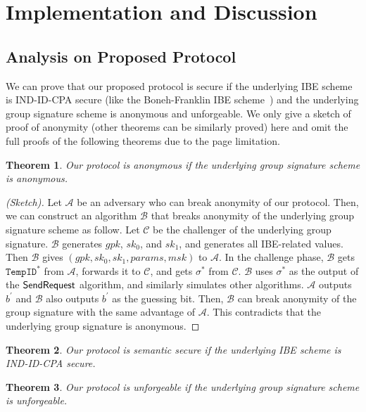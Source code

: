 \documentclass[preprint]{sig-alternate}
\newtheorem{theorem}{Theorem}[section]
\begin{document}
\section{Implementation and Discussion}

\subsection{Analysis on Proposed Protocol}

We can prove that our proposed protocol is secure if the underlying IBE scheme is IND-ID-CPA secure (like the Boneh-Franklin IBE scheme~\cite{[BonehF03]}) and the underlying group signature scheme is anonymous and unforgeable. 
We only give a sketch of proof of anonymity (other theorems can be similarly proved) here and omit the full proofs of the following theorems due to the page limitation. 

\begin{theorem}
Our protocol is anonymous if the underlying group signature scheme is anonymous. 
\end{theorem}

\begin{proof}[(Sketch)] Let $\mathcal{A}$ be an adversary who can break anonymity of our protocol. Then, we can construct an algorithm $\mathcal{B}$ that breaks anonymity of the underlying group signature scheme as follow. Let $\mathcal{C}$ be the challenger of the underlying group signature. 
$\mathcal{B}$ generates $gpk$, $sk_0$, and $sk_1$, and generates all IBE-related values. Then $\mathcal{B}$ gives $(gpk,sk_0,sk_1,\allowbreak params,\allowbreak msk)$ to $\mathcal{A}$. In the challenge phase, $\mathcal{B}$ gets $\mathtt{TempID}^\ast$ from $\mathcal{A}$, forwards it to $\mathcal{C}$, and gets $\sigma^\ast$ from $\mathcal{C}$. $\mathcal{B}$ uses $\sigma^\ast$ as the output of the ${\sf SendRequest}$ algorithm, and similarly simulates other algorithms. $\mathcal{A}$ outputs $b^\prime$ and $\mathcal{B}$ also outputs $b^\prime$ as the guessing bit. Then, $\mathcal{B}$ can break anonymity of the group signature with the same advantage of $\mathcal{A}$. This contradicts that the underlying group signature is anonymous.
\end{proof}

\begin{theorem}
Our protocol is semantic secure if the underlying IBE scheme is IND-ID-CPA secure. 
\end{theorem}


\begin{theorem}
Our protocol is unforgeable if the underlying group signature scheme is unforgeable. 
\end{theorem}
\end{document}
